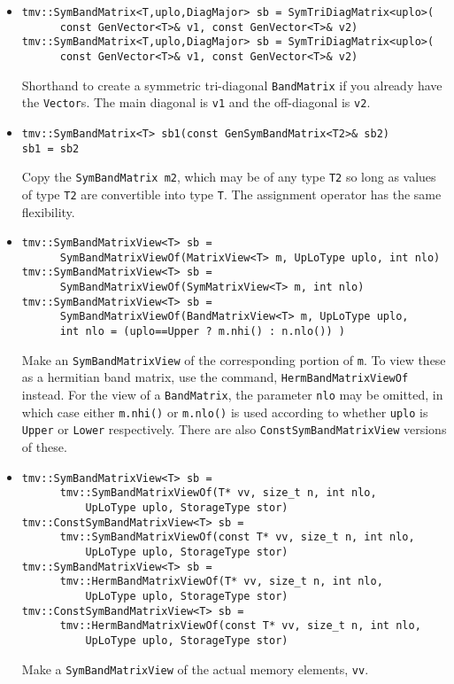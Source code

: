 \documentclass[twoside,letterpaper,11pt]{article}
\renewcommand{\tt}[1]{{\texttt {#1}}}
\begin{document}
\begin{itemize}
\item
\begin{verbatim}
tmv::SymBandMatrix<T,uplo,DiagMajor> sb = SymTriDiagMatrix<uplo>(
      const GenVector<T>& v1, const GenVector<T>& v2)
tmv::SymBandMatrix<T,uplo,DiagMajor> sb = SymTriDiagMatrix<uplo>(
      const GenVector<T>& v1, const GenVector<T>& v2)
\end{verbatim}
Shorthand to create a symmetric tri-diagonal \tt{BandMatrix} 
if you already have the \tt{Vector}s.  
The main diagonal is \tt{v1} and the off-diagonal is \tt{v2}.

\item
\begin{verbatim}
tmv::SymBandMatrix<T> sb1(const GenSymBandMatrix<T2>& sb2)
sb1 = sb2
\end{verbatim}
Copy the \tt{SymBandMatrix m2}, which may be of any type \tt{T2} so long
as values of type \tt{T2} are convertible into type \tt{T}.
The assignment operator has the same flexibility.

\item
\begin{verbatim}
tmv::SymBandMatrixView<T> sb = 
      SymBandMatrixViewOf(MatrixView<T> m, UpLoType uplo, int nlo)
tmv::SymBandMatrixView<T> sb = 
      SymBandMatrixViewOf(SymMatrixView<T> m, int nlo)
tmv::SymBandMatrixView<T> sb = 
      SymBandMatrixViewOf(BandMatrixView<T> m, UpLoType uplo, 
      int nlo = (uplo==Upper ? m.nhi() : n.nlo()) )
\end{verbatim}
Make an \tt{SymBandMatrixView} of the corresponding portion of \tt{m}.  
To view these as a hermitian band matrix, use the command,
\tt{HermBandMatrixViewOf} instead.
For the view of a \tt{BandMatrix}, the parameter \tt{nlo} may be 
omitted, in which case either \tt{m.nhi()} or \tt{m.nlo()} is used 
according to whether \tt{uplo} is \tt{Upper} or \tt{Lower} respectively.
There are also \tt{ConstSymBandMatrixView} versions of these.

\item
\begin{verbatim}
tmv::SymBandMatrixView<T> sb = 
      tmv::SymBandMatrixViewOf(T* vv, size_t n, int nlo, 
          UpLoType uplo, StorageType stor)
tmv::ConstSymBandMatrixView<T> sb = 
      tmv::SymBandMatrixViewOf(const T* vv, size_t n, int nlo, 
          UpLoType uplo, StorageType stor)
tmv::SymBandMatrixView<T> sb = 
      tmv::HermBandMatrixViewOf(T* vv, size_t n, int nlo, 
          UpLoType uplo, StorageType stor)
tmv::ConstSymBandMatrixView<T> sb = 
      tmv::HermBandMatrixViewOf(const T* vv, size_t n, int nlo, 
          UpLoType uplo, StorageType stor)
\end{verbatim}
Make a \tt{SymBandMatrixView} of the actual memory elements, \tt{vv}.

\end{itemize}
\end{document}
